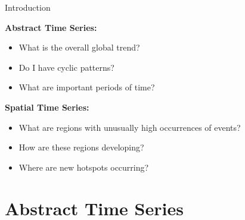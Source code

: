 \documentclass[10pt]{beamer}
\begin{document}
\begin{frame}{Introduction}
	\centering
	\begin{minipage}[t]{0.475\textwidth}
		\textbf{Abstract Time Series:}
		\begin{itemize}
			\item What is the overall global trend?
			\item Do I have cyclic patterns?
			\item What are important periods of time?
		\end{itemize}
	\end{minipage}
	\hfill
	\begin{minipage}[t]{0.475\textwidth}
		\textbf{Spatial Time Series:}
		\begin{itemize}
			\item What are regions with unusually high occurrences of events?
			\item How are these regions developing? 
			\item Where are new hotspots occurring? 
		\end{itemize}
	\end{minipage}
\end{frame}


\section{Abstract Time Series}

\end{document}
